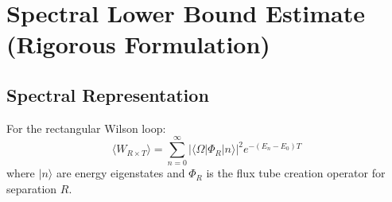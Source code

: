﻿\section{Spectral Lower Bound Estimate (Rigorous Formulation)}
\label{sec:spectral-lower-bound}

\subsection{Spectral Representation}

\begin{theorem}
\label{thm:spectral-wilson}
For the rectangular Wilson loop:
\[
\langle W_{R \times T} \rangle = \sum_{n=0}^\infty |\langle \Omega | \Phi_R | n \rangle|^2 e^{-(E_n - E_0)T}
\]
where $|n\rangle$ are energy eigenstates and $\Phi_R$ is the flux tube 
creation operator for separation $R$.
\end{theorem}

